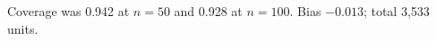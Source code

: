 \documentclass{article}
\begin{document}
Coverage was 0.942 at $n=50$ and 0.928 at $n=100$.
Bias $-0.013$; total 3{,}533 units.
\end{document}
